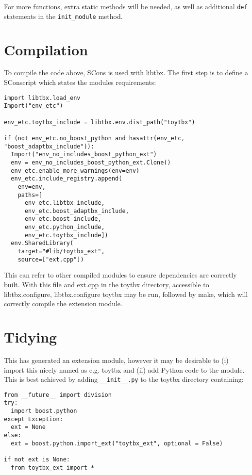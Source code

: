 \documentclass[a4paper, 11pt]{article}
\begin{document}
For more functions, extra static methods will be needed, as well as additional \verb|def| statements in the \verb|init_module| method.

\section{Compilation}

To compile the code above, SCons is used with libtbx. The first step is to define a SConscript which states the modules requirements:

{\small
\begin{verbatim}
import libtbx.load_env
Import("env_etc")

env_etc.toytbx_include = libtbx.env.dist_path("toytbx")

if (not env_etc.no_boost_python and hasattr(env_etc, "boost_adaptbx_include")):
  Import("env_no_includes_boost_python_ext")
  env = env_no_includes_boost_python_ext.Clone()
  env_etc.enable_more_warnings(env=env)
  env_etc.include_registry.append(
    env=env,
    paths=[
      env_etc.libtbx_include,
      env_etc.boost_adaptbx_include,
      env_etc.boost_include,
      env_etc.python_include,
      env_etc.toytbx_include])
  env.SharedLibrary(
    target="#lib/toytbx_ext",
    source=["ext.cpp"])
\end{verbatim}
}

This can refer to other compiled modules to ensure dependencies are correctly built. With this file and ext.cpp in the toytbx directory, accessible to libtbx.configure, libtbx.configure toytbx may be run, followed by make, which will correctly compile the extension module.

\section{Tidying}

This has generated an extension module, however it may be desirable to (i) import this nicely named as e.g. toytbx and (ii) add Python code to the module. This is best achieved by adding \verb|__init__.py| to the toytbx directory containing:

{\small
\begin{verbatim}
from __future__ import division
try:
  import boost.python
except Exception:
  ext = None
else:
  ext = boost.python.import_ext("toytbx_ext", optional = False)

if not ext is None:
  from toytbx_ext import *
\end{verbatim}
}
\end{document}
